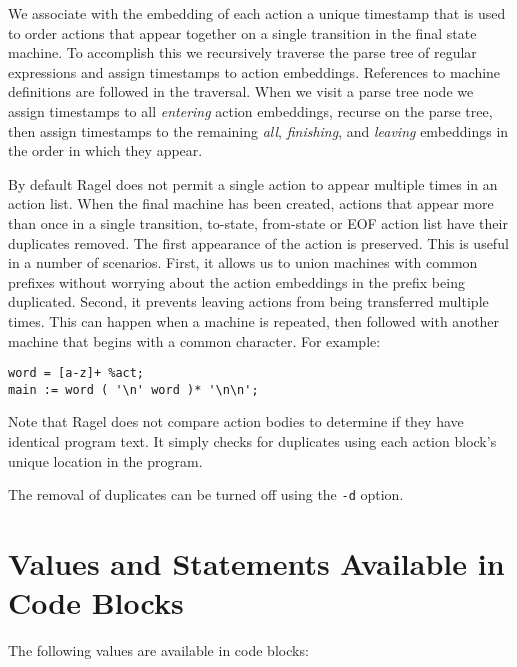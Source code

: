 \documentclass[letterpaper,11pt,oneside]{book}
\newcommand{\verbspace}{\vspace{10pt}}
\begin{document}
We associate with the embedding of each action a unique timestamp that is
used to order actions that appear together on a single transition in the final
state machine. To accomplish this we recursively traverse the parse tree of
regular expressions and assign timestamps to action embeddings. References to
machine definitions are followed in the traversal. When we visit a
parse tree node we assign timestamps to all {\em entering} action embeddings,
recurse on the parse tree, then assign timestamps to the remaining {\em all},
{\em finishing}, and {\em leaving} embeddings in the order in which they
appear.

By default Ragel does not permit a single action to appear multiple times in an action
list. When the final machine has been created, actions that appear more than
once in a single transition, to-state, from-state or EOF action list have their
duplicates removed.
The first appearance of the action is preserved. This is useful in a number of
scenarios. First, it allows us to union machines with common prefixes without
worrying about the action embeddings in the prefix being duplicated. Second, it
prevents leaving actions from being transferred multiple times. This can
happen when a machine is repeated, then followed with another machine that
begins with a common character. For example:

\begin{verbatim}
word = [a-z]+ %act;
main := word ( '\n' word )* '\n\n';
\end{verbatim}
\verbspace

Note that Ragel does not compare action bodies to determine if they have
identical program text. It simply checks for duplicates using each action
block's unique location in the program.

The removal of duplicates can be turned off using the \verb|-d| option.

\section{Values and Statements Available in Code Blocks}
\label{vals}

The following values are available in code blocks:
\end{document}
